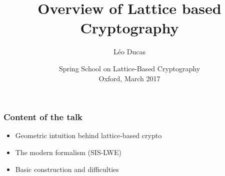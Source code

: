 \documentclass{beamer} %
\title{Overview of Lattice based Cryptography}
\author[Léo Ducas, CWI, Amsterdam, The Netherlands]{\Large Léo Ducas}
\institute{CWI, Amsterdam, The Netherlands \\
\texttt{[image: img/CWI.png]}
}
\date{Spring School on Lattice-Based Cryptography \\
Oxford, March 2017}
\begin{document}
 

\begin{frame}
\titlepage
\end{frame}
\usebackgroundtemplate{}

\begin{frame}
\frametitle{Content of the talk}
\begin{itemize}
  \item Geometric intuition behind lattice-based crypto
  \item The modern formalism (SIS-LWE)
  \item Basic construction and difficulties
\end{itemize}

  
\end{frame}





\end{document}
